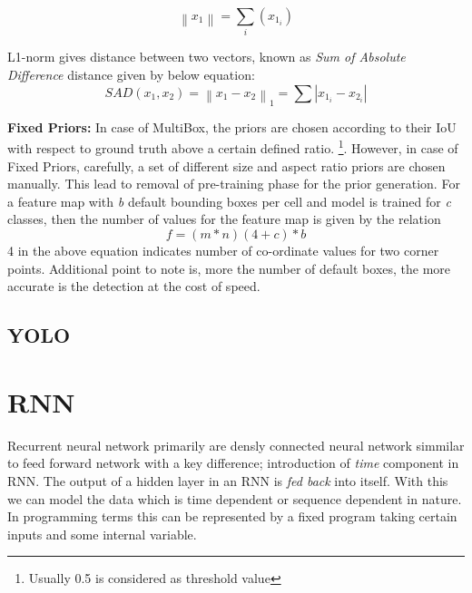 \begin{equation}
	\left \| x_1 \right \| =\sum_i(x_{1_i})
\end {equation}

L1-norm gives distance between two vectors, known as \textit{Sum of Absolute Difference} distance given by below equation:
\begin{equation}
	SAD(x_1,x_2) = \left \| x_1-x_2 \right \|_1 = \sum \left | x_{1_i}-x_{2_i} \right |
\end {equation}

\textbf{Fixed Priors:} In case of MultiBox, the priors are chosen according to their IoU with respect to ground truth above a certain defined ratio. \footnote{Usually 0.5 is considered as threshold value}.
However, in case of Fixed Priors, carefully, a set of different size and aspect ratio priors are chosen manually. This lead to removal of pre-training phase for the prior generation. For a feature map with \textit{b} default bounding boxes per cell and model is trained for \textit{c} classes, then the number of values for the feature map is given by the relation 
\begin{equation}
	f = (m * n )  (4 + c) * b
\end {equation}
4 in the above equation indicates number of co-ordinate values for two corner points. Additional point to note is, more the number of default boxes, the more accurate is the detection at the cost of speed.
\subsection{YOLO}


 
\section{RNN}
Recurrent neural network primarily are densly connected neural network simmilar to feed forward network with a key difference; introduction of \textit{time} component in RNN. The output of a hidden layer in an RNN is \textit{fed back } into itself. With this we can model the data which is time dependent or sequence dependent in nature. In programming terms this can be represented by a fixed program taking certain inputs and some internal variable.
\begin{center}


\end{center}

